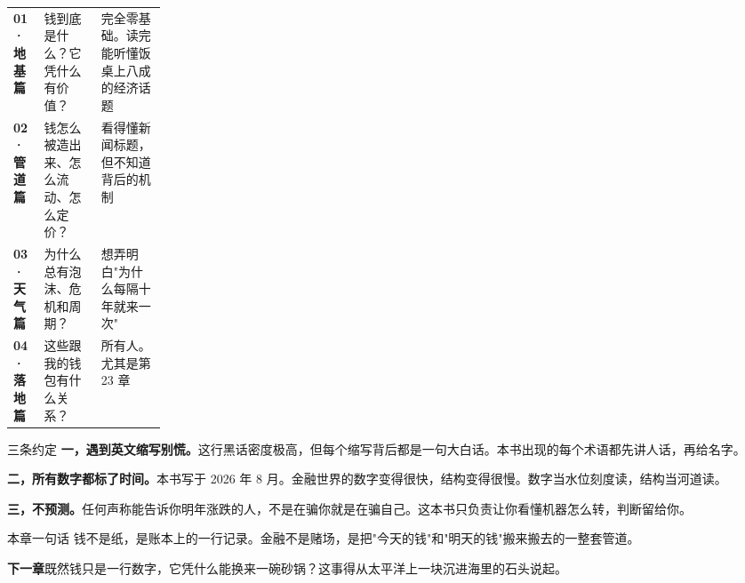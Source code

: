 \begin{tablewrap}
\begin{xltabular}{\linewidth}{>{\raggedright\arraybackslash}p{0.20\linewidth}XX}
\toprule
{} &  &  \\
\midrule
\textbf{01 · 地基篇} & 钱到底是什么？它凭什么有价值？ & 完全零基础。读完能听懂饭桌上八成的经济话题 \\
\textbf{02 · 管道篇} & 钱怎么被造出来、怎么流动、怎么定价？ & 看得懂新闻标题，但不知道背后的机制 \\
\textbf{03 · 天气篇} & 为什么总有泡沫、危机和周期？ & 想弄明白"为什么每隔十年就来一次" \\
\textbf{04 · 落地篇} & 这些跟我的钱包有什么关系？ & 所有人。尤其是第 23 章 \\
\bottomrule
\end{xltabular}
\end{tablewrap}

\begin{databox}{三条约定}
\textbf{一，遇到英文缩写别慌。}这行黑话密度极高，但每个缩写背后都是一句大白话。本书出现的每个术语都先讲人话，再给名字。

\textbf{二，所有数字都标了时间。}本书写于 2026 年 8 月。金融世界的数字变得很快，结构变得很慢。数字当水位刻度读，结构当河道读。

\textbf{三，不预测。}任何声称能告诉你明年涨跌的人，不是在骗你就是在骗自己。这本书只负责让你看懂机器怎么转，判断留给你。

\end{databox}

\begin{takeaway}{本章一句话}
钱不是纸，是账本上的一行记录。金融不是赌场，是把"今天的钱"和"明天的钱"搬来搬去的一整套管道。

\end{takeaway}

\begin{bridgebox}
\textbf{下一章}既然钱只是一行数字，它凭什么能换来一碗砂锅？这事得从太平洋上一块沉进海里的石头说起。
\end{bridgebox}

